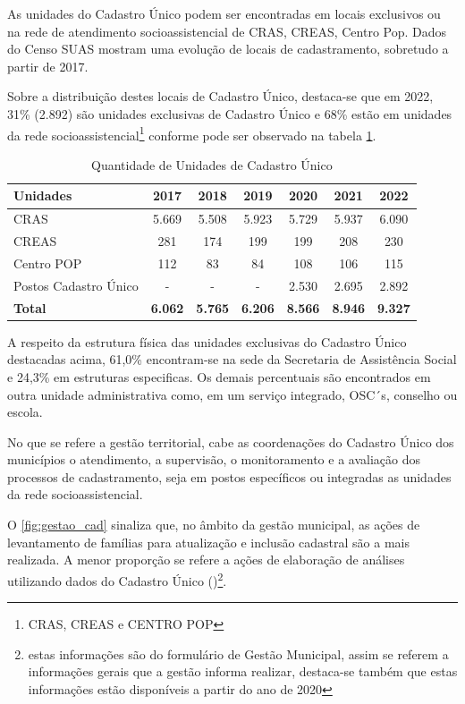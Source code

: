 \documentclass[
  brazilian]{report}
\begin{document}
As unidades do Cadastro Único podem ser encontradas em locais exclusivos
ou na rede de atendimento socioassistencial de CRAS, CREAS, Centro Pop.
Dados do Censo SUAS mostram uma evolução de locais de cadastramento,
sobretudo a partir de 2017.

Sobre a distribuição destes locais de Cadastro Único, destaca-se que em
2022, 31\% (2.892) são unidades exclusivas de Cadastro Único e 68\%
estão em unidades da rede
socioassistencial\footnote{CRAS, CREAS e CENTRO POP} conforme pode ser
observado na tabela \ref{tab:qtd_unidades}.

\begin{table}[H]
\centering
\caption{Quantidade de Unidades de Cadastro Único}
\label{tab:qtd_unidades}
\begin{tabular}{@{}lcccccc@{}}
\toprule
Unidades             & 2017  & 2018 & 2019 & 2020 &  2021 & 2022            \\ \midrule
CRAS                    & 5.669 & 5.508 & 5.923 & 5.729 & 5.937 & 6.090         \\
CREAS                   & 281 & 174 & 199 & 199 & 208 & 230                     \\
Centro POP              & 112 & 83 & 84 & 108 & 106 & 115                       \\
Postos Cadastro Único   & - & - & - & 2.530 & 2.695 & 2.892                       \\ \bottomrule
\textbf{Total}                   &\textbf{6.062} & \textbf{5.765} & \textbf{6.206} & \textbf{8.566} & \textbf{8.946} & \textbf{9.327}          \\ \bottomrule
\end{tabular}
\end{table}

A respeito da estrutura física das unidades exclusivas do Cadastro Único
destacadas acima, 61,0\% encontram-se na sede da Secretaria de
Assistência Social e 24,3\% em estruturas especificas. Os demais
percentuais são encontrados em outra unidade administrativa como, em um
serviço integrado, OSC´s, conselho ou escola.

No que se refere a gestão territorial, cabe as coordenações do Cadastro
Único dos municípios o atendimento, a supervisão, o monitoramento e a
avaliação dos processos de cadastramento, seja em postos específicos ou
integradas as unidades da rede socioassistencial.

O \cref{fig:gestao_cad} sinaliza que, no âmbito da gestão municipal, as
ações de levantamento de famílias para atualização e inclusão cadastral
são a mais realizada. A menor proporção se refere a ações de elaboração
de análises utilizando dados do Cadastro Único
()\footnote{estas informações são do formulário de Gestão Municipal, assim se referem a informações gerais que a gestão informa realizar, destaca-se também que estas informações estão disponíveis a partir do ano de 2020}.
\end{document}

